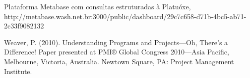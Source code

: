 \documentclass[
12pt,		%
openright,	%
twoside,  %
a4paper,			%
chapter=TITLE,		%
english,			%
french,				%
spanish,			%
brazil				%
]{USPSC-classe/USPSC}
\begin{document}
\begin{flushleft}
\begin{flushleft}
\begin{flushleft}
\begin{flushleft}
\begin{flushleft}
\begin{flushleft}
\begin{flushleft}
\begin{flushleft}
\begin{flushleft}
[WASH, 2023] Plataforma Metabase com consultas estruturadas \`a Platu\'oxe, http://metabase.wash.net.br:3000/public/dashboard/29c7c658-d71b-4bc5-ab71-2c33f9082132
\end{flushleft}


\end{flushleft}


\end{flushleft}


\end{flushleft}


\end{flushleft}


\end{flushleft}


\end{flushleft}


\end{flushleft}


\end{flushleft}


\begin{flushleft}
\begin{flushleft}
\begin{flushleft}
\begin{flushleft}
\begin{flushleft}
\begin{flushleft}
\begin{flushleft}
\begin{flushleft}
\begin{flushleft}
[Weaver, 2010] Weaver, P. (2010). Understanding Programs and Projects—Oh, There's a Difference! Paper presented at PMI® Global Congress 2010—Asia Pacific, Melbourne, Victoria, Australia. Newtown Square, PA: Project Management Institute.
\end{flushleft}


\end{flushleft}


\end{flushleft}


\end{flushleft}


\end{flushleft}


\end{flushleft}


\end{flushleft}


\end{flushleft}


\end{flushleft}
\end{document}

